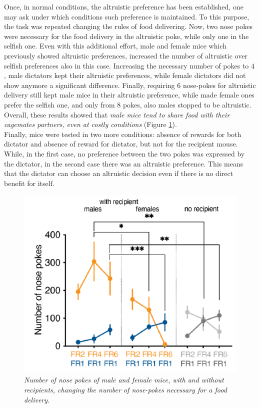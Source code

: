 \documentclass[12pt, a4paper]{article}
\begin{document}
Once, in normal conditions, the altruistic preference has been established, one may ask under which conditions such preference is maintained. To this purpose, the task was repeated changing the rules of food delivering. Now, two nose pokes were necessary for the food delivery in the altruistic poke, while only one in the selfish one. Even with this additional effort, male and female mice which previously showed altruistic preferences, increased the number of altruistic over selfish preferences also in this case. Increasing the necessary number of pokes to $4$, male dictators kept their altruistic preferences, while female dictators did not show anymore a significant difference. Finally, requiring $6$ nose-pokes for altruistic delivery still kept male mice in their altruistic preference, while made female ones prefer the selfish one, and only from $8$ pokes, also males stopped to be altruistic. Overall, these results showed that \textit{male mice tend to share food with their cagemates partners, even at costly conditions} (Figure \ref{number_pokes}).\\
Finally, mice were tested in two more conditions: absence of rewards for both dictator and absence of reward for dictator, but not for the recipient mouse. While, in the first case, no preference between the two pokes was expressed by the dictator, in the second case there was an altruistic preference. This means that the dictator can choose an altruistic decision even if there is no direct benefit for itself.


\begin{figure}[H]
	\begin{center}
		\includegraphics[scale=0.6]{number_pokes.png} 
	\end{center} 
	\caption{\textit{Number of nose pokes of male and female mice, with and without recipients, changing the number of nose-pokes necessary for a food delivery.}} \label{number_pokes}
	
\end{figure}
\end{document}

